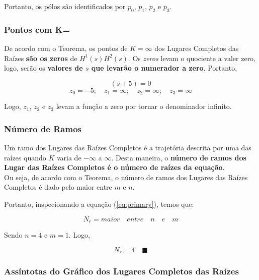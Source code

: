 \documentclass[a4paper, 12pt]{article}
\begin{document}
Portanto, os pólos são identificados por $p_{0}$, $p_{1}$, $p_{2}$ e $p_{3}$. \blacksquare



\subsubsection{Pontos com K=\infty}

De acordo com o Teorema, os pontos de $K = \infty$ dos Lugares Completos das Raízes \textbf{são os zeros} de $H^1(s)H^2(s)$. Os \textit{zeros} levam o quociente a valer zero, logo, serão os \textbf{valores de $s$ que levarão o numerador a zero}. Portanto,

\begin{equation}
    (s+5)=0
\end{equation}
\begin{equation}
      z_{0}=-5; \quad  z_{1} = \infty; \quad z_{2}=\infty; \quad z_{3} = \infty
\end{equation}

Logo, $z_{1}$, $z_{2}$ e $z_{3}$ levam a função a zero por tornar o denominador infinito. \blacksquare



\subsubsection{Número de Ramos} 
Um ramo dos Lugares das Raízes Completos é a trajetória descrita por uma das raízes quando $K$ varia de $-\infty$ a $\infty$. Desta maneira, o \textbf{número de ramos dos Lugar das Raízes Completos é o número de raízes da equação}. \\

Ou seja, de acordo com o Teorema, o número de ramos dos Lugares das Raízes Completos é dado pelo maior entre $m$ e $n$. 

Portanto, inspecionando a equação (\ref{eq:primary}), temos que:

 \begin{equation}
    N_{r}= maior\quad entre\quad n\quad e\quad m
\end{equation}

Sendo $n = 4$ e $m = 1$. Logo, 

\begin{equation}
    N_{r}= 4 \quad \blacksquare
\end{equation}


\subsubsection{Assíntotas do Gráfico dos Lugares Completos das Raízes} 
\end{document}
